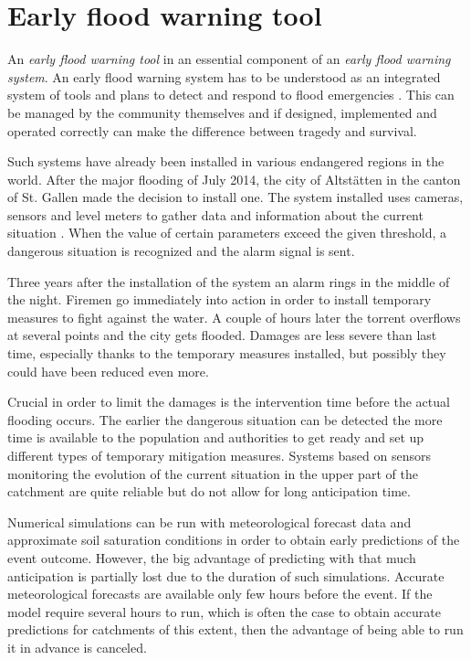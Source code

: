\chapter{Early flood warning tool}
\label{chp:flood_warning_system}


An \textit{early flood warning tool} in an essential component of an \textit{early flood warning system}.
An early flood warning system has to be understood as an integrated system of tools and plans to detect and respond to flood emergencies \autocite{icimod_early_2018}.
This can be managed by the community themselves and if designed, implemented and operated correctly can make the difference between tragedy and survival.

Such systems have already been installed in various endangered regions in the world.
After the major flooding of July 2014, the city of Altstätten in the canton of St. Gallen made the decision to install one.
The system installed uses cameras, sensors and level meters to gather data and information about the current situation \autocite{st._galler_tageblatt_altstatten_2017}.
When the value of certain parameters exceed the given threshold, a dangerous situation is recognized and the alarm signal is sent.

Three years after the installation of the system an alarm rings in the middle of the night.
Firemen go immediately into action in order to install temporary measures to fight against the water.
A couple of hours later the torrent overflows at several points and the city gets flooded.
Damages are less severe than last time, especially thanks to the temporary measures installed, but possibly they could have been reduced even more.

Crucial in order to limit the damages is the intervention time before the actual flooding occurs.
The earlier the dangerous situation can be detected the more time is available to the population and authorities to get ready and set up different types of temporary mitigation measures.
Systems based on sensors monitoring the evolution of the current situation in the upper part of the catchment are quite reliable but do not allow for long anticipation time. 

Numerical simulations can be run with meteorological forecast data and approximate soil saturation conditions in order to obtain early predictions of the event outcome.
However, the big advantage of predicting with that much anticipation is partially lost due to the duration of such simulations.
Accurate meteorological forecasts are available only few hours before the event.
If the model require several hours to run, which is often the case to obtain accurate predictions for catchments of this extent, then the advantage of being able to run it in advance is canceled.

